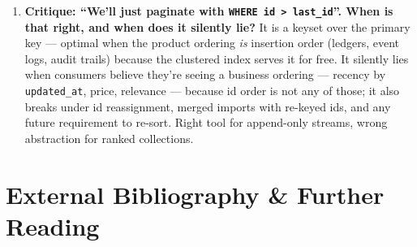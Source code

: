\begin{enumerate}[label=\textbf{Q\arabic*.}, leftmargin=2.6em]
        One envelope shape (\texttt{items}, \texttt{has\_more},
        \texttt{next\_cursor}), one cursor format (signed, versioned,
        expiring), \texttt{Link} headers mandatory, \texttt{total\_count}
        opt-in only, \texttt{MAX\_LIMIT} set platform-wide, a unique
        tie-breaker on every ordered endpoint, an allow-listed filter
        grammar with a fixed operator set, an \texttt{EXPLAIN} plan
        attached to every list-endpoint PR, and a benchmark gate on
        depth-scaling. Standards exist so that the wrong thing is the hard
        thing.
  \item \textbf{Critique: ``We'll just paginate with
        \texttt{WHERE id > last\_id}''. When is that right, and when does it
        silently lie?}
        It is a keyset over the primary key --- optimal when the product
        ordering \emph{is} insertion order (ledgers, event logs, audit
        trails) because the clustered index serves it for free. It silently
        lies when consumers believe they're seeing a business ordering ---
        recency by \texttt{updated\_at}, price, relevance --- because id
        order is not any of those; it also breaks under id reassignment,
        merged imports with re-keyed ids, and any future requirement to
        re-sort. Right tool for append-only streams, wrong abstraction for
        ranked collections.
\end{enumerate}

\section{External Bibliography \& Further Reading}
\label{sec:ch8-bibliography}


